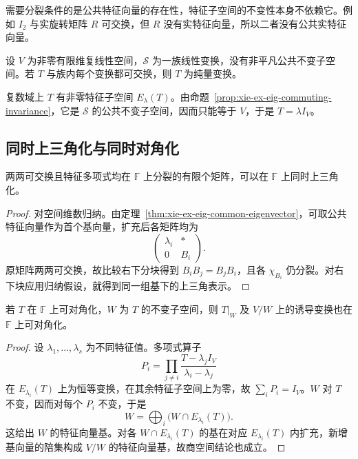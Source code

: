 需要分裂条件的是公共特征向量的存在性，特征子空间的不变性本身不依赖它。例如 $I_2$ 与实旋转矩阵 $R$ 可交换，但 $R$ 没有实特征向量，所以二者没有公共实特征向量。

\begin{example}
设 $V$ 为非零有限维复线性空间，$\mathcal S$ 为一族线性变换，没有非平凡公共不变子空间。若 $T$ 与族内每个变换都可交换，则 $T$ 为纯量变换。
\end{example}
\begin{solve}
复数域上 $T$ 有非零特征子空间 $E_\lambda(T)$。由命题~\ref{prop:xie-ex-eig-commuting-invariance}，它是 $\mathcal S$ 的公共不变子空间，因而只能等于 $V$，于是 $T=\lambda I_V$。
\end{solve}

\subsection{同时上三角化与同时对角化}

\begin{theorem}
\label{thm:xie-ex-eig-simultaneous-triangular}
两两可交换且特征多项式均在 $\mathbb F$ 上分裂的有限个矩阵，可以在 $\mathbb F$ 上同时上三角化。
\end{theorem}
\begin{proof}
对空间维数归纳。由定理~\ref{thm:xie-ex-eig-common-eigenvector}，可取公共特征向量作为首个基向量，扩充后各矩阵均为
\[
\begin{pmatrix}\lambda_i&*\\0&B_i\end{pmatrix}.
\]
原矩阵两两可交换，故比较右下分块得到 $B_iB_j=B_jB_i$，且各 $\chi_{B_i}$ 仍分裂。对右下块应用归纳假设，就得到同一组基下的上三角表示。
\end{proof}

\begin{lemma}
\label{lem:xie-ex-eig-diagonal-restriction}
若 $T$ 在 $\mathbb F$ 上可对角化，$W$ 为 $T$ 的不变子空间，则 $T|_W$ 及 $V/W$ 上的诱导变换也在 $\mathbb F$ 上可对角化。
\end{lemma}
\begin{proof}
设 $\lambda_1,\ldots,\lambda_s$ 为不同特征值。多项式算子
\[
P_i=\prod_{j\ne i}\frac{T-\lambda_jI_V}{\lambda_i-\lambda_j}
\]
在 $E_{\lambda_i}(T)$ 上为恒等变换，在其余特征子空间上为零，故 $\sum_iP_i=I_V$。$W$ 对 $T$ 不变，因而对每个 $P_i$ 不变，于是
\[
W=\bigoplus_i\bigl(W\cap E_{\lambda_i}(T)\bigr).
\]
这给出 $W$ 的特征向量基。对各 $W\cap E_{\lambda_i}(T)$ 的基在对应 $E_{\lambda_i}(T)$ 内扩充，新增基向量的陪集构成 $V/W$ 的特征向量基，故商空间结论也成立。
\end{proof}

